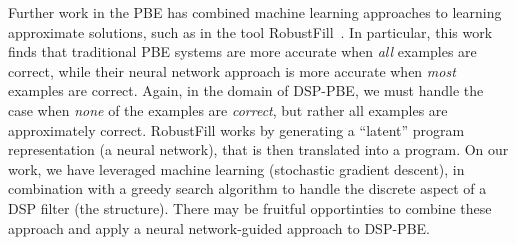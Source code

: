 Further work in the PBE has combined machine learning approaches to learning approximate solutions, such as in the tool RobustFill~\cite{devlin2017robustfill}.
In particular, this work finds that traditional PBE systems are more accurate when \textit{all} examples are correct, while their neural network approach is more accurate when \textit{most} examples are correct.
Again, in the domain of DSP-PBE, we must handle the case when \textit{none} of the examples are \textit{correct}, but rather all examples are approximately correct.
RobustFill works by generating a ``latent'' program representation (a neural network), that is then translated into a program.
On our work, we have leveraged machine learning (stochastic gradient descent), in combination with a greedy search algorithm to handle the discrete aspect of a DSP filter (the structure).
There may be fruitful opportinties to combine these approach and apply a neural network-guided approach to DSP-PBE.







